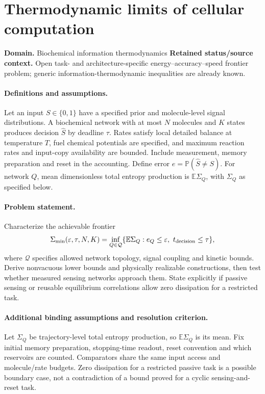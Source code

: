 \documentclass[11pt]{article}
\begin{document}
\section*{Thermodynamic limits of cellular computation}
\label{prob:100}
\label{rank:229}
\par\smallskip

\noindent\textbf{Domain.} Biochemical information thermodynamics \quad \textbf{Retained status/source context.} Open task- and architecture-specific energy--accuracy--speed frontier problem; generic information-thermodynamic inequalities are already known.
\paragraph{Definitions and assumptions.} Let an input $S\in\{0,1\}$ have a specified prior and molecule-level signal distributions. A biochemical network with at most $N$ molecules and $K$ states produces decision $\widehat S$ by deadline $\tau$. Rates satisfy local detailed balance at temperature $T$, fuel chemical potentials are specified, and maximum reaction rates and input-copy availability are bounded. Include measurement, memory preparation and reset in the accounting. Define error $e=\mathbb{P}(\widehat S\ne S)$. For network $Q$, mean dimensionless total entropy production is $\mathbb{E}\Sigma_Q$, with $\Sigma_Q$ as specified below.
\paragraph{Problem statement.} Characterize the achievable frontier
\[\Sigma_{\min}(\varepsilon,\tau,N,K)=\inf_{Q\in\mathcal Q}\{\mathbb{E}\Sigma_Q:e_Q\le\varepsilon,\ t_{\rm decision}\le\tau\},\]
where $\mathcal Q$ specifies allowed network topology, signal coupling and kinetic bounds. Derive nonvacuous lower bounds and physically realizable constructions, then test whether measured sensing networks approach them. State explicitly if passive sensing or reusable equilibrium correlations allow zero dissipation for a restricted task.
\paragraph{Additional binding assumptions and resolution criterion.} Let $\Sigma_Q$ be trajectory-level total entropy production, so $\mathbb{E}\Sigma_Q$ is its mean. Fix initial memory preparation, stopping-time readout, reset convention and which reservoirs are counted. Comparators share the same input access and molecule/rate budgets. Zero dissipation for a restricted passive task is a possible boundary case, not a contradiction of a bound proved for a cyclic sensing-and-reset task.
\end{document}
